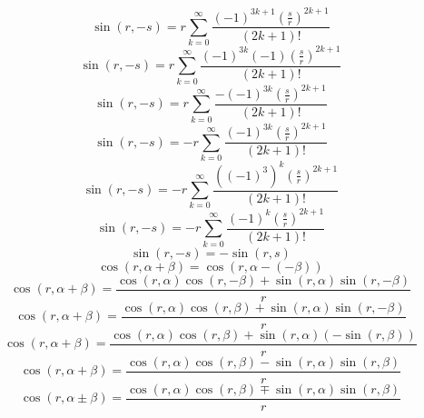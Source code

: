 \documentclass[a4paper,12pt]{report}
\begin{document}
\begin{equation}
\sin(r,-s) = r \sum \limits_{k=0}^{\infty} \frac{(-1)^{3k+1} \left(\frac{s}{r}\right)^{2k+1}}{(2k+1)!}
\end{equation}
\begin{equation}
\sin(r,-s) = r \sum \limits_{k=0}^{\infty} \frac{(-1)^{3k} (-1) \left(\frac{s}{r}\right)^{2k+1}}{(2k+1)!}
\end{equation}
\begin{equation}
\sin(r,-s) = r \sum \limits_{k=0}^{\infty} \frac{-(-1)^{3k} \left(\frac{s}{r}\right)^{2k+1}}{(2k+1)!}
\end{equation}
\begin{equation}
\sin(r,-s) = -r \sum \limits_{k=0}^{\infty} \frac{(-1)^{3k} \left(\frac{s}{r}\right)^{2k+1}}{(2k+1)!}
\end{equation}
\begin{equation}
\sin(r,-s) = -r \sum \limits_{k=0}^{\infty} \frac{((-1)^3)^k \left(\frac{s}{r}\right)^{2k+1}}{(2k+1)!}
\end{equation}
\begin{equation}
\sin(r,-s) = -r \sum \limits_{k=0}^{\infty} \frac{(-1)^k \left(\frac{s}{r}\right)^{2k+1}}{(2k+1)!}
\end{equation}
\begin{equation}
\sin(r,-s) = -\sin(r,s)
\end{equation}
\begin{equation}
\cos(r,\alpha + \beta) = \cos(r,\alpha - (-\beta))
\end{equation}
\begin{equation}
\cos(r,\alpha + \beta) = \frac{\cos(r,\alpha) \cos(r,-\beta) + \sin(r,\alpha) \sin(r,-\beta)}{r}
\end{equation}
\begin{equation}
\cos(r,\alpha + \beta) = \frac{\cos(r,\alpha) \cos(r,\beta) + \sin(r,\alpha) \sin(r,-\beta)}{r}
\end{equation}
\begin{equation}
\cos(r,\alpha + \beta) = \frac{\cos(r,\alpha) \cos(r,\beta) + \sin(r,\alpha) (-\sin(r,\beta))}{r}
\end{equation}
\begin{equation}
\cos(r,\alpha + \beta) = \frac{\cos(r,\alpha) \cos(r,\beta) - \sin(r,\alpha) \sin(r,\beta)}{r}
\end{equation}
\begin{equation}
\cos(r,\alpha \pm \beta) = \frac{\cos(r,\alpha) \cos(r,\beta) \mp \sin(r,\alpha) \sin(r,\beta)}{r}
\end{equation}
\end{document}
